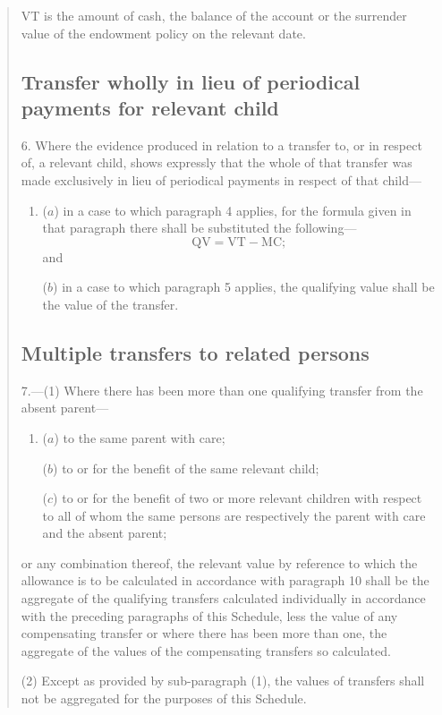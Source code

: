 \documentclass[12pt,a4paper]{article}
\begin{document}
\begin{quotation}
\begin{enumerate}
VT is the amount of cash, the balance of the account or the surrender value of the endowment policy on the relevant date.
\end{enumerate}

\subsection*{Transfer wholly in lieu of periodical payments for relevant child}

6.  Where the evidence produced in relation to a transfer to, or in respect of, a relevant child, shows expressly that the whole of that transfer was made exclusively in lieu of periodical payments in respect of that child—
\begin{enumerate}\item[]
($a$) in a case to which paragraph 4 applies, for the formula given in that paragraph there shall be substituted the following—
\[\mathrm{QV} = \mathrm{VT} - \mathrm{MC};\]
and

($b$) in a case to which paragraph 5 applies, the qualifying value shall be the value of the transfer.
\end{enumerate}

\subsection*{Multiple transfers to related persons}

7.—(1) Where there has been more than one qualifying transfer from the absent parent—
\begin{enumerate}\item[]
($a$) to the same parent with care;

($b$) to or for the benefit of the same relevant child;

($c$) to or for the benefit of two or more relevant children with respect to all of whom the same persons are respectively the parent with care and the absent parent;
\end{enumerate}
or any combination thereof, the relevant value by reference to which the allowance is to be calculated in accordance with paragraph 10 shall be the aggregate of the qualifying transfers calculated individually in accordance with the preceding paragraphs of this Schedule, less the value of any compensating transfer or where there has been more than one, the aggregate of the values of the compensating transfers so calculated.

(2) Except as provided by sub-paragraph (1), the values of transfers shall not be aggregated for the purposes of this Schedule.


\end{quotation}
\end{document}
